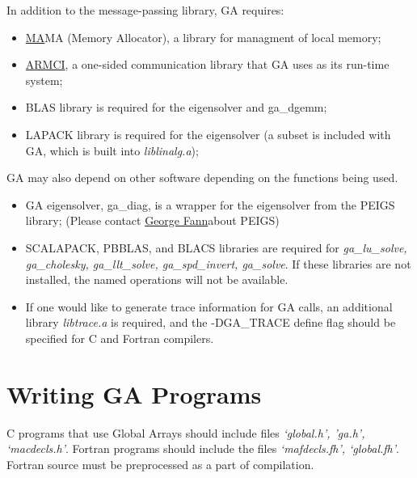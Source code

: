 In addition to the message-passing library, GA requires:
\begin{itemize}
\item \href{http://www.emsl.pnl.gov/docs/parsoft/ma/MAapi.html}{MA}MA (Memory
Allocator), a library for managment of local memory; 
\item \href{http://www.emsl.pnl.gov/docs/parsoft/armci}{ARMCI}, a one-sided
communication library that GA uses as its run-time system; 
\item BLAS library is required for the eigensolver and ga\_dgemm; 
\item LAPACK library is required for the eigensolver (a subset is included
with GA, which is built into \emph{liblinalg.a});
\end{itemize}
GA may also depend on other software depending on the functions being
used.
\begin{itemize}
\item GA eigensolver, ga\_diag, is a wrapper for the eigensolver from the
PEIGS library; (Please contact \href{mailto:fanngi@ornl.gov}{George Fann}about
PEIGS) 
\item SCALAPACK, PBBLAS, and BLACS libraries are required for \emph{ga\_lu\_solve,
ga\_cholesky, ga\_llt\_solve, ga\_spd\_invert, ga\_solve}. If these
libraries are not installed, the named operations will not be available. 
\item If one would like to generate trace information for GA calls, an additional
library \emph{libtrace.a} is required, and the -DGA\_TRACE define
flag should be specified for C and Fortran compilers.
\end{itemize}

\section{Writing GA Programs }

C programs that use Global Arrays should include files \emph{`global.h',
'ga.h', `macdecls.h'}. Fortran programs should include the files \emph{`mafdecls.fh',
`global.fh'}. Fortran source must be preprocessed as a part of compilation.

